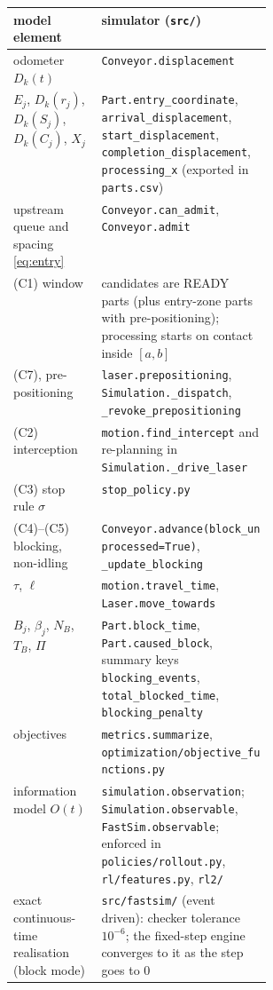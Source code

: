 \documentclass[11pt,a4paper]{article}
\theoremstyle{definition}
\theoremstyle{remark}
\begin{document}
\begin{center}
\begin{tabularx}{\linewidth}{@{}>{\raggedright\arraybackslash}p{0.34\linewidth} X@{}}
\toprule
model element & simulator (\texttt{src/})\\
\midrule
odometer $D_k(t)$ & \texttt{Conveyor.displacement}\\
$E_j$, $D_k(r_j)$, $D_k(S_j)$, $D_k(C_j)$, $X_j$ & \texttt{Part.entry\_coordinate}, \texttt{arrival\_displacement}, \texttt{start\_displacement}, \texttt{completion\_displacement}, \texttt{processing\_x} (exported in \texttt{parts.csv})\\
upstream queue and spacing \eqref{eq:entry} & \texttt{Conveyor.can\_admit}, \texttt{Conveyor.admit}\\
(C1) window & candidates are READY parts (plus entry-zone parts with pre-positioning); processing starts on contact inside $[a,b]$\\
(C7), pre-positioning & \texttt{laser.prepositioning}, \texttt{Simulation.\_dispatch}, \texttt{\_revoke\_prepositioning}\\
(C2) interception & \texttt{motion.find\_intercept} and re-planning in \texttt{Simulation.\_drive\_laser}\\
(C3) stop rule $\sigma$ & \texttt{stop\_policy.py}\\
(C4)--(C5) blocking, non-idling & \texttt{Conveyor.advance(block\_unprocessed=True)}, \texttt{\_update\_blocking}\\
$\tau$, $\ell$ & \texttt{motion.travel\_time}, \texttt{Laser.move\_towards}\\
$B_j$, $\beta_j$, $N_B$, $T_B$, $\Pi$ & \texttt{Part.block\_time}, \texttt{Part.caused\_block}, summary keys \texttt{blocking\_events}, \texttt{total\_blocked\_time}, \texttt{blocking\_penalty}\\
objectives & \texttt{metrics.summarize}, \texttt{optimization/objective\_functions.py}\\
information model $O(t)$ & \texttt{simulation.observation}; \texttt{Simulation.observable}, \texttt{FastSim.observable}; enforced in \texttt{policies/rollout.py}, \texttt{rl/features.py}, \texttt{rl2/}\\
exact continuous-time realisation (block mode) & \texttt{src/fastsim/} (event driven): checker tolerance $10^{-6}$; the fixed-step engine converges to it as the step goes to $0$\\
\bottomrule
\end{tabularx}
\end{center}
\end{document}
